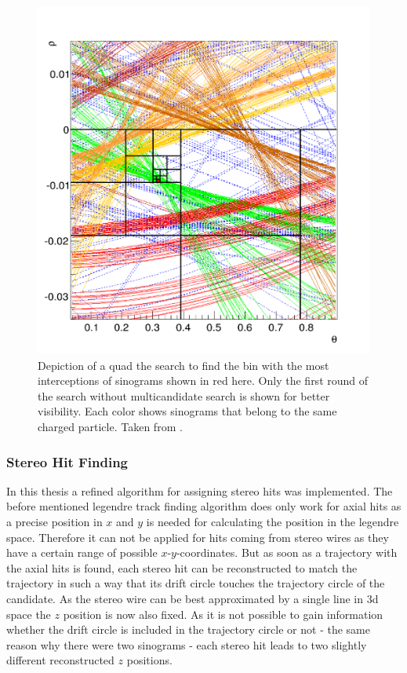 \begin{figure}
  \centering
  \includegraphics[width=0.6\linewidth]{figures/theory/quad_tree.png}
  \caption[Quad tree search.]{Depiction of a quad the search to find the bin with the most interceptions of sinograms shown in red here. Only the first round of the search without multicandidate search is shown for better visibility. Each color shows sinograms that belong to the same charged particle. Taken from \cite{viktor_dpg}.}
  \label{fig-quad-tree-search}
\end{figure}


\subsubsection{Stereo Hit Finding}

In this thesis a refined algorithm for assigning stereo hits was implemented. The before mentioned legendre track finding algorithm does only work for axial hits as a precise position in $x$ and $y$ is needed for calculating the position in the legendre space. Therefore it can not be applied for hits coming from stereo wires as they have a certain range of possible $x$-$y$-coordinates. But as soon as a trajectory with the axial hits is found, each stereo hit can be reconstructed to match the trajectory in such a way that its drift circle touches the trajectory circle of the candidate. As the stereo wire can be best approximated by a single line in 3d space the $z$ position is now also fixed. As it is not possible to gain information whether the drift circle is included in the trajectory circle or not - the same reason why there were two sinograms - each stereo hit leads to two slightly different reconstructed $z$ positions. 

